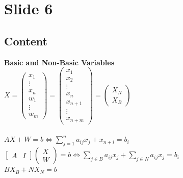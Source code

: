 \documentclass{article}%
\begin{document}
%
\newpage%
\section{Slide 6}%
\label{sec:Slide6}%
\subsection{Content}%

\textbf{Basic and Non-Basic Variables} \\
$X = \begin{pmatrix} x_1 \\ \vdots \\ x_n \\ w_1 \\ \vdots \\ w_m \end{pmatrix} = \begin{pmatrix} x_1 \\ x_2 \\ \vdots \\ x_n \\ x_{n+1} \\ \vdots \\ x_{n+m} \end{pmatrix} = \begin{pmatrix} X_N \\ X_B \end{pmatrix}$
\qquad {} \\
\qquad {} \\
$AX + W = b \iff \sum_{j=1}^n a_{ij} x_j + x_{n+i} = b_i$ \\
$\begin{bmatrix} A & I \end{bmatrix} \begin{pmatrix} X \\ W \end{pmatrix} = b \iff \sum_{j \in B} a_{ij} x_j + \sum_{j \in N} a_{ij} x_j = b_i$ \\
$BX_B + NX_N = b$
%
\end{document}
